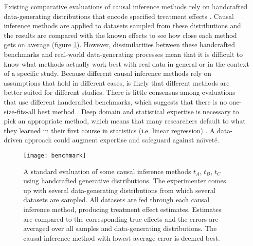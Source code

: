 Existing comparative evaluations of causal inference methods rely on handcrafted data-generating distributions that encode specified treatment effects \cite{Setoguchi2008, Colson:2016fu, Shortreed:2017fk, Antonelli:2016ve, Lee2010, Hill2011}. Causal inference methods are applied to datasets sampled from these distributions and the results are compared with the known effects to see how close each method gets on average (figure \ref{fig:bakeoff}). However, dissimilarities between these handcrafted benchmarks and real-world data-generating processes mean that it is difficult to know what methods actually work best with real data in general or in the context of a specific study. Because different causal inference methods rely on assumptions that hold in different cases, is likely that different methods are better suited for different studies. There is little consensus among evaluations that use different handcrafted benchmarks, which suggests that there is no one-size-fits-all best method \cite{Setoguchi2008, Colson:2016fu, Shortreed:2017fk, Antonelli:2016ve, Lee2010, Hill2011}. Deep domain and statistical expertise is necessary to pick an appropriate method, which means that many researchers default to what they learned in their first course in statistics (i.e. linear regression) \cite{Stuart2010}. A data-driven approach could augment expertise and safeguard against na\"{\i}vet\'{e}. 

\begin{figure}[h!]
\centering
\texttt{[image: benchmark]} 
\caption{A standard evaluation of some causal inference methods $t_A$, $t_B$, $t_C$ using handcrafted generative distributions. The experimenter comes up with several data-generating distributions from which several datasets are sampled. All datasets are fed through each causal inference method, producing treatment effect estimates. Estimates are compared to the corresponding true effects and the errors are averaged over all samples and data-generating distributions. The causal inference method with lowest average error is deemed best.}
\label{fig:bakeoff}
\end{figure}


